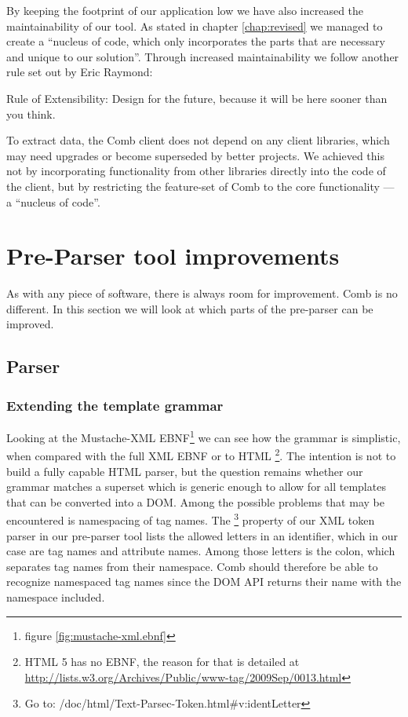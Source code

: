 \documentclass[thesis.tex]{subfiles}
\begin{document}
By keeping the footprint of our application low we have also increased the
maintainability of our tool. As stated in chapter \ref{chap:revised} we managed
to create a ``nucleus of code, which only incorporates the parts that are
necessary and unique to our solution''. Through increased maintainability we
follow another rule set out by Eric Raymond:
\begin{citequote}{\cite[Chapter 1]{UXART}}
Rule of Extensibility: Design for the future, because it will be here sooner than you think.
\end{citequote}
To extract data, the Comb client does not depend on any client libraries, which
may need upgrades or become superseded by better projects.
We achieved this not by incorporating functionality from other libraries
directly into the code of the client, but by restricting the feature-set of Comb
to the core functionality --- a ``nucleus of code''.




\section{Pre-Parser tool improvements}
As with any piece of software, there is always room for improvement.
Comb is no different. In this section we will look at which parts of the
pre-parser can be improved.

\subsection{Parser}

\subsubsection{Extending the template grammar}
Looking at the Mustache-XML EBNF\footnote{figure \ref{fig:mustache-xml.ebnf}} we
can see how the grammar is simplistic, when compared with the
full XML EBNF \cite[section 2/\#sec-documents]{XMLSPEC} or to
HTML \cite{HTMLSPEC}\footnote{HTML 5 has no EBNF, the reason for that is
detailed at \url{http://lists.w3.org/Archives/Public/www-tag/2009Sep/0013.html}
}. The intention is not to build a fully capable HTML parser, but the question
remains whether our grammar matches a superset which is generic enough to allow
for all templates that can be converted into a DOM. Among the possible problems
that may be encountered is namespacing of tag names. The 
\cite{PARSECDOC}\footnote{Go to: /doc/html/Text-Parsec-Token.html\#v:identLetter
} property of our XML token parser in our
pre-parser tool lists the allowed letters in an identifier,
which in our case are tag names and attribute names. Among those letters is
the colon, which separates tag names from their namespace.
Comb should therefore be able to recognize namespaced tag names since the
DOM API returns their name with the namespace included.
\end{document}
